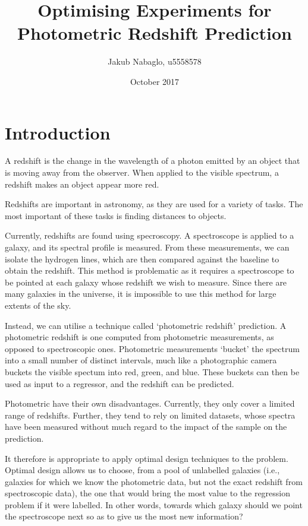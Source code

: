 \documentclass[11pt]{report}
\title{Optimising Experiments for Photometric Redshift Prediction}
\author{Jakub Nabaglo, u5558578}
\date{October 2017}
\begin{document}
\maketitle

\tableofcontents

\chapter{Introduction}
A redshift is the change in the wavelength of a photon emitted by an object that is moving away from the observer. When applied to the visible spectrum, a redshift makes an object appear more red.

Redshifts are important in astronomy, as they are used for a variety of tasks. The most important of these tasks is finding distances to objects.

Currently, redshifts are found using specroscopy. A spectroscope is applied to a galaxy, and its spectral profile is measured. From these measurements, we can isolate the hydrogen lines, which are then compared against the baseline to obtain the redshift. This method is problematic as it requires a spectroscope to be pointed at each galaxy whose redshift we wish to measure. Since there are many galaxies in the universe, it is impossible to use this method for large extents of the sky.

Instead, we can utilise a technique called `photometric redshift' prediction. A photometric redshift is one computed from photometric measurements, as opposed to spectroscopic ones. Photometric measurements `bucket' the spectrum into a small number of distinct intervals, much like a photographic camera buckets the visible spectum into red, green, and blue. These buckets can then be used as input to a regressor, and the redshift can be predicted.

Photometric have their own disadvantages. Currently, they only cover a limited range of redshifts. Further, they tend to rely on limited datasets, whose spectra have been measured without much regard to the impact of the sample on the prediction.

It therefore is appropriate to apply optimal design techniques to the problem. Optimal design allows us to choose, from a pool of unlabelled galaxies (i.e., galaxies for which we know the photometric data, but not the exact redshift from spectroscopic data), the one that would bring the most value to the regression problem if it were labelled. In other words, towards which galaxy should we point the spectroscope next so as to give us the most new information?
\end{document}
